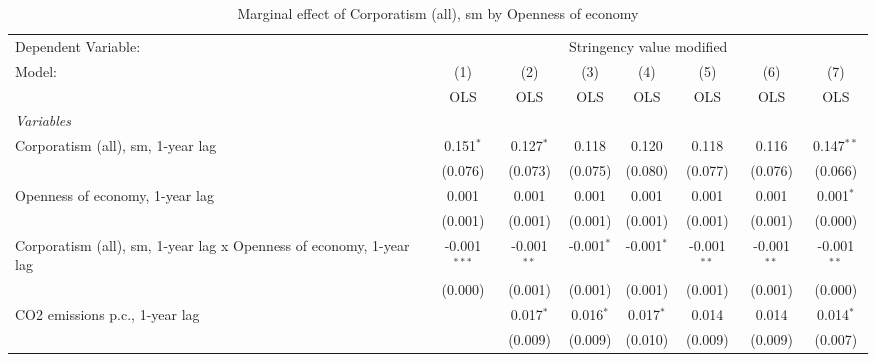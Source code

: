 
\begin{table}[htbp]
   \caption{Marginal effect of Corporatism (all), sm by Openness of economy}
   \centering
   \begin{tabular}{lccccccc}
      \toprule
      Dependent Variable: & \multicolumn{7}{c}{Stringency value modified}\\
      Model:                                                              & (1)            & (2)           & (3)          & (4)          & (5)           & (6)           & (7)\\  
                                                                          &  OLS           & OLS           & OLS          & OLS          & OLS           & OLS           & OLS\\  
      \midrule
      \emph{Variables}\\
      Corporatism (all), sm, 1-year lag                                   & 0.151$^{*}$    & 0.127$^{*}$   & 0.118        & 0.120        & 0.118         & 0.116         & 0.147$^{**}$\\   
                                                                          & (0.076)        & (0.073)       & (0.075)      & (0.080)      & (0.077)       & (0.076)       & (0.066)\\   
      Openness of economy, 1-year lag                                     & 0.001          & 0.001         & 0.001        & 0.001        & 0.001         & 0.001         & 0.001$^{*}$\\   
                                                                          & (0.001)        & (0.001)       & (0.001)      & (0.001)      & (0.001)       & (0.001)       & (0.000)\\   
      Corporatism (all), sm, 1-year lag x Openness of economy, 1-year lag & -0.001$^{***}$ & -0.001$^{**}$ & -0.001$^{*}$ & -0.001$^{*}$ & -0.001$^{**}$ & -0.001$^{**}$ & -0.001$^{**}$\\   
                                                                          & (0.000)        & (0.001)       & (0.001)      & (0.001)      & (0.001)       & (0.001)       & (0.000)\\   
      CO2 emissions p.c., 1-year lag                                      &                & 0.017$^{*}$   & 0.016$^{*}$  & 0.017$^{*}$  & 0.014         & 0.014         & 0.014$^{*}$\\   
                                                                          &                & (0.009)       & (0.009)      & (0.010)      & (0.009)       & (0.009)       & (0.007)\\   

\end{tabular}
\end{table}
